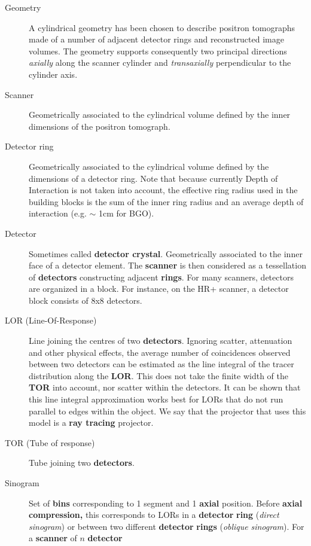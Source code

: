 \documentclass{article}
\begin{document}
\begin{description}
\item[Geometry] 
A cylindrical geometry has been chosen to describe positron 
tomographs made of a number of adjacent detector rings and reconstructed 
image volumes. The geometry supports consequently two principal 
directions \textit{axially} along the scanner cylinder and \textit{transaxially} 
perpendicular to the cylinder axis.
\item[Scanner] 
Geometrically associated to the cylindrical volume defined by 
the inner dimensions of the positron tomograph.
\item[Detector ring ] 
Geometrically associated to the cylindrical volume defined by 
the dimensions of a detector ring. Note that because currently 
Depth of Interaction is not taken into account, the effective ring radius 
used in the building blocks is the sum of the inner ring radius 
and an average depth of interaction (e.g. \ensuremath{\sim} 1cm for BGO).
\item[Detector] 
Sometimes called \textbf{detector crystal}. Geometrically associated 
to the inner face of a detector element. The \textbf{scanner} is then 
considered as a tessellation of \textbf{detectors} constructing adjacent \textbf{rings}. 
For many scanners, detectors are organized in a block. For instance, 
on the HR+ scanner, a detector block consists of 8x8 detectors.
\item[LOR (Line-Of-Response)] 
Line joining the centres of two \textbf{detectors}. Ignoring scatter, 
attenuation and other physical effects, the average number of 
coincidences observed between two detectors can be estimated 
as the line integral of the tracer distribution along the \textbf{LOR}. 
This does not take the finite width of the \textbf{TOR} into account, 
nor scatter within the detectors. It can be shown that this line 
integral approximation works best for LORs that do not run parallel 
to edges within the object. We say that the projector that uses 
this model is a \textbf{ray tracing} projector.
\item[TOR (Tube of response)] 
Tube joining two \textbf{detectors}. 
\item[Sinogram] 
Set of \textbf{bins} corresponding to 1 segment and 1 \textbf{axial} position. 
Before \textbf{axial compression,} this corresponds to LORs in a \textbf{detector} \textbf{ring} 
(\textit{direct} \textit{sinogram}) or between two different \textbf{detector} \textbf{rings} 
(\textit{oblique} \textit{sinogram}). For a \textbf{scanner} of $n$ \textbf{detector 
}
\end{description}
\end{document}
